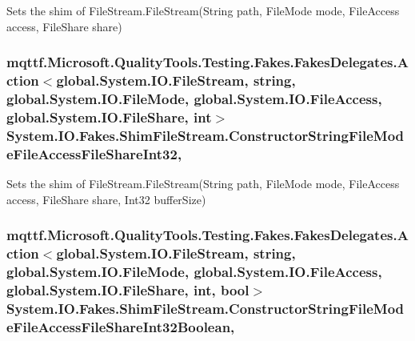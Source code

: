 Sets the shim of File\-Stream.\-File\-Stream(\-String path, File\-Mode mode, File\-Access access, File\-Share share)

\hypertarget{class_system_1_1_i_o_1_1_fakes_1_1_shim_file_stream_a9357cffd31aad06496405ce0e87466e7}{
\subsubsection[{Constructor\-String\-File\-Mode\-File\-Access\-File\-Share\-Int32}]{\setlength{\rightskip}{0pt plus 5cm}mqttf.\-Microsoft.\-Quality\-Tools.\-Testing.\-Fakes.\-Fakes\-Delegates.\-Action$<$global.\-System.\-I\-O.\-File\-Stream, string, global.\-System.\-I\-O.\-File\-Mode, global.\-System.\-I\-O.\-File\-Access, global.\-System.\-I\-O.\-File\-Share, int$>$ System.\-I\-O.\-Fakes.\-Shim\-File\-Stream.\-Constructor\-String\-File\-Mode\-File\-Access\-File\-Share\-Int32\hspace{0.3cm}{\ttfamily [static]}, {\ttfamily [set]}}}\label{class_system_1_1_i_o_1_1_fakes_1_1_shim_file_stream_a9357cffd31aad06496405ce0e87466e7}


Sets the shim of File\-Stream.\-File\-Stream(\-String path, File\-Mode mode, File\-Access access, File\-Share share, Int32 buffer\-Size)

\hypertarget{class_system_1_1_i_o_1_1_fakes_1_1_shim_file_stream_ac7a8b3870ff54840d50c96eb6673d7cc}{
\subsubsection[{Constructor\-String\-File\-Mode\-File\-Access\-File\-Share\-Int32\-Boolean}]{\setlength{\rightskip}{0pt plus 5cm}mqttf.\-Microsoft.\-Quality\-Tools.\-Testing.\-Fakes.\-Fakes\-Delegates.\-Action$<$global.\-System.\-I\-O.\-File\-Stream, string, global.\-System.\-I\-O.\-File\-Mode, global.\-System.\-I\-O.\-File\-Access, global.\-System.\-I\-O.\-File\-Share, int, bool$>$ System.\-I\-O.\-Fakes.\-Shim\-File\-Stream.\-Constructor\-String\-File\-Mode\-File\-Access\-File\-Share\-Int32\-Boolean\hspace{0.3cm}{\ttfamily [static]}, {\ttfamily [set]}}}\label{class_system_1_1_i_o_1_1_fakes_1_1_shim_file_stream_ac7a8b3870ff54840d50c96eb6673d7cc}


